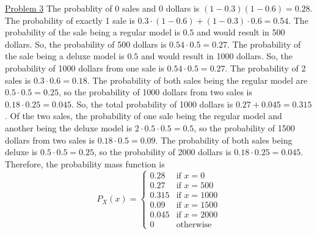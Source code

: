 \documentclass{exam}
\begin{document}
\underline{Problem 3}
\newline
\newline
The probablity of 0 sales and 0 dollars is $(1-0.3)(1-0.6)=0.28$. The probability of exactly 1 sale is $0.3\cdot(1-0.6)+(1-0.3)\cdot0.6=0.54$. The probability of the sale being a regular model is $0.5$ and would result in 500 dollars. So, the probability of 500 dollars is $0.54\cdot0.5=0.27$. The probability of the sale being a deluxe model is $0.5$ and would result in 1000 dollars. So, the probability of 1000 dollars from one sale is $0.54\cdot0.5=0.27$. The probability of 2 sales is $0.3\cdot0.6=0.18$. The probability of both sales being the regular model are $0.5\cdot0.5=0.25$, so the probability of 1000 dollars from two sales is $0.18\cdot0.25=0.045$. So, the total probability of 1000 dollars is $0.27+0.045=0.315$. Of the two sales, the probability of one sale being the regular model and another being the deluxe model is $2\cdot0.5\cdot0.5=0.5$, so the probability of 1500 dollars from two sales is $0.18\cdot0.5=0.09$. The probability of both sales being deluxe is $0.5\cdot0.5=0.25$, so the probability of 2000 dollars is $0.18\cdot0.25=0.045$. Therefore, the probability mass function is \[
    P_X(x) = \begin{cases}
    0.28 & \text{if } x = 0 \\
    0.27 & \text{if } x = 500 \\
    0.315 & \text{if } x = 1000 \\
    0.09 & \text{if } x = 1500 \\
    0.045 & \text{if } x = 2000 \\
    0 & \text{otherwise}
    \end{cases}
\]
\newline
\end{document}
